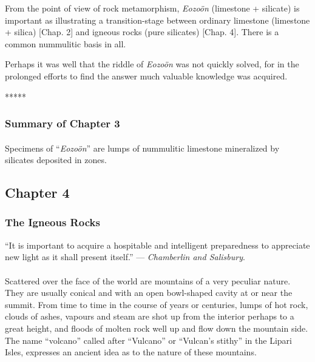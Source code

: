 \documentclass[a4paper, 12pt, oneside]{article}
\begin{document}
From the point of view of rock metamorphism, \emph{Eozoön} (limestone + silicate) is important as illustrating a transition-stage between ordinary limestone (limestone + silica) [Chap. 2] and igneous rocks (pure silicates) [Chap. 4]. There is a common nummulitic basis in all.

Perhaps it was well that the riddle of \emph{Eozoön} was not quickly solved, for in the prolonged efforts to find the answer much valuable knowledge was acquired.

\centerline{*\hspace{15mm}*\hspace{15mm}*\hspace{15mm}*\hspace{15mm}*}
\bigskip

\subsubsection{Summary of Chapter 3}
\paragraph{}
Specimens of ``\emph{Eozoön}'' are lumps of nummulitic limestone mineralized by silicates deposited in zones.
\clearpage
\subsection{Chapter 4}
\subsubsection{The Igneous Rocks}
\begin{displayquote}
``It is important to acquire a hospitable and intelligent preparedness to appreciate new light as it shall present itself.'' --- \emph{Chamberlin and Salisbury}.
\end{displayquote}
\paragraph{}
Scattered over the face of the world are mountains of a very peculiar nature. They are usually conical and with an open bowl-shaped cavity at or near the summit. From time to time in the course of years or centuries, lumps of hot rock, clouds of ashes, vapours and steam are shot up from the interior perhaps to a great height, and floods of molten rock well up and flow down the mountain side. The name ``volcano'' called after ``Vulcano'' or ``Vulcan's stithy'' in the Lipari Isles, expresses an ancient idea as to the nature of these mountains.
\end{document}
